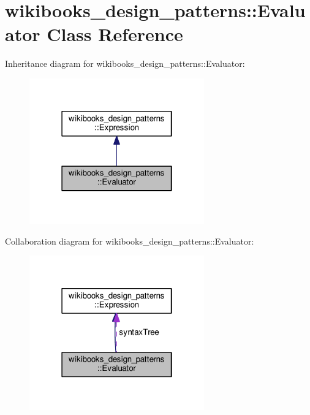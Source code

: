 \hypertarget{classwikibooks__design__patterns_1_1Evaluator}{}\section{wikibooks\+\_\+design\+\_\+patterns\+:\+:Evaluator Class Reference}
\label{classwikibooks__design__patterns_1_1Evaluator}


Inheritance diagram for wikibooks\+\_\+design\+\_\+patterns\+:\+:Evaluator\+:
\nopagebreak
\begin{figure}[H]
\begin{center}
\leavevmode
\includegraphics[width=214pt]{classwikibooks__design__patterns_1_1Evaluator__inherit__graph}
\end{center}
\end{figure}


Collaboration diagram for wikibooks\+\_\+design\+\_\+patterns\+:\+:Evaluator\+:
\nopagebreak
\begin{figure}[H]
\begin{center}
\leavevmode
\includegraphics[width=214pt]{classwikibooks__design__patterns_1_1Evaluator__coll__graph}
\end{center}
\end{figure}
